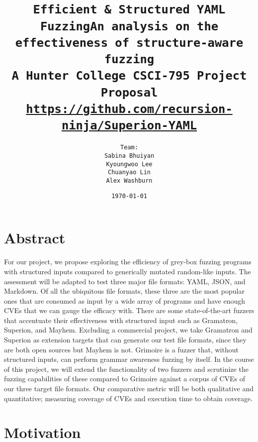 \documentclass[12pt]{diazessay}
\title{\texttt{\huge{Efficient \& Structured YAML FuzzingAn analysis on the effectiveness of structure-aware fuzzing} \\\vspace{-0.65cm} {\large A Hunter College CSCI-795 Project Proposal}\\\normalsize\url{https://github.com/recursion-ninja/Superion-YAML}}} %
\author{\texttt{{\Huge Team:}\\\vspace*{-0.5em} 
		Sabina Bhuiyan \\\vspace*{-0.5em} 
		Kyoungwoo Lee \\\vspace*{-0.5em}
		Chuanyao Lin \\\vspace*{-0.25em}
		Alex Washburn}} %
\date{\texttt{\today}} %
\begin{document}
\maketitle %

\vspace{-2cm}
\section*{Abstract}


For our project, we propose exploring the efficiency of grey-box fuzzing programs with structured inputs compared to generically mutated random-like inputs.
The assessment will be adapted to test three major file formats: YAML, JSON, and Markdown.
Of all the ubiquitous file formats, these three are the most popular ones that are consumed as input by a wide array of programs and have enough CVEs that we can gauge the efficacy with.
There are some state-of-the-art fuzzers that accentuate their effectiveness with structured input such as Gramatron, Superion, and Mayhem.
Excluding a commercial project, we take Gramatron and Superion as extension targets that can generate our test file formats, since they are both open sources but Mayhem is not.
Grimoire is a fuzzer that, without structured inputs, can perform grammar awareness fuzzing by itself.
In the course of this project, we will extend the functionality of two fuzzers and scrutinize the fuzzing capabilities of these compared to Grimoire against a corpus of CVEs of our three target file formats.
Our comparative metric will be both qualitative and quantitative; measuring coverage of CVEs and execution time to obtain coverage.

\section*{Motivation}
\end{document}
